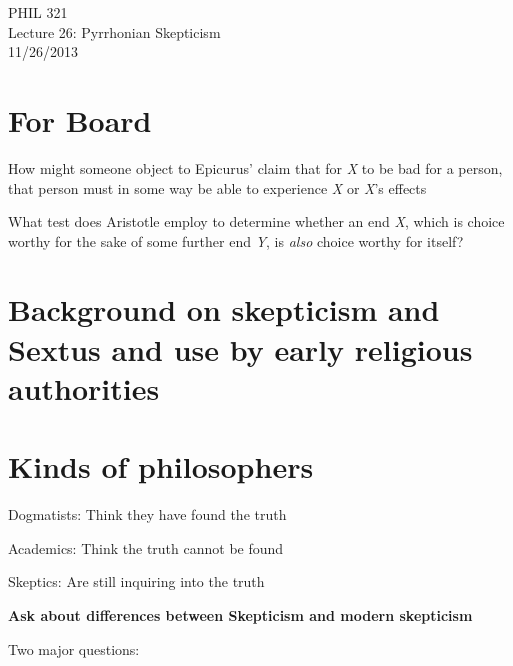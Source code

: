 \documentclass[11pt]{article}
\begin{document}
\thispagestyle{empty}
\begin{center} \LARGE{PHIL 321\\ Lecture 26: Pyrrhonian Skepticism}\\ \vspace*{2mm}
\large{11/26/2013}\end{center}
\thispagestyle{empty}\vspace*{3mm}
\vspace*{-8mm}

\section*{For Board}

\noindent How might someone object to Epicurus' claim that for \emph{X} to be bad for a person, that person must in some way be able to experience \emph{X} or \emph{X}'s effects
\vspace*{2mm}

\noindent What test does Aristotle employ to determine whether an end \emph{X}, which is choice worthy for the sake of some further end \emph{Y}, is \emph{also} choice worthy for itself?

\section*{Background on skepticism and Sextus and use by early religious authorities}

\section*{Kinds of philosophers}

\noindent Dogmatists: Think they have found the truth
\vspace*{2mm}

\noindent Academics: Think the truth cannot be found
\vspace*{2mm}

\noindent Skeptics: Are still inquiring into the truth
\vspace*{2mm}

\noindent\textbf{\large{Ask about differences between Skepticism and modern skepticism}}
\vspace*{2mm}

\noindent Two major questions:
\vspace*{2mm}
\end{document}
